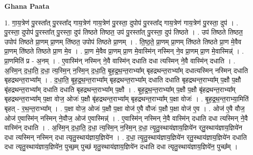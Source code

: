 \documentclass[17pt]{extarticle}
\begin{document}
\textbf{Ghana Paata } \newline

1. गा॒य॒त्रेण॑ पु॒रस्ता᳚त् पु॒रस्ता᳚द् गाय॒त्रेण॑ गाय॒त्रेण॑ पु॒रस्ता॒ दुपोप॑ पु॒रस्ता᳚द् गाय॒त्रेण॑ गाय॒त्रेण॑ पु॒रस्ता॒ दुप॑ । . पु॒रस्ता॒ दुपोप॑ पु॒रस्ता᳚त् पु॒रस्ता॒ दुप॑ तिष्ठते तिष्ठत॒ उप॑ पु॒रस्ता᳚त् पु॒रस्ता॒ दुप॑ तिष्ठते । . उप॑ तिष्ठते तिष्ठत॒ उपोप॑ तिष्ठते प्रा॒णम् प्रा॒णम् ति॑ष्ठत॒ उपोप॑ तिष्ठते प्रा॒णम् । . ति॒ष्ठ॒ते॒ प्रा॒णम् प्रा॒णम् ति॑ष्ठते तिष्ठते प्रा॒ण मे॒वैव प्रा॒णम् ति॑ष्ठते तिष्ठते प्रा॒ण मे॒व । . प्रा॒ण मे॒वैव प्रा॒णम् प्रा॒ण मे॒वास्मि॑न् नस्मिन् ने॒व प्रा॒णम् प्रा॒ण मे॒वास्मिन्न्॑ । . प्रा॒णमिति॑ प्र - अ॒नम् । . ए॒वास्मि॑न् नस्मिन् ने॒वै वास्मि॑न् दधाति दधा त्यस्मिन् ने॒वै वास्मि॑न् दधाति । . अ॒स्मि॒न् द॒धा॒ति॒ द॒धा॒ त्य॒स्मि॒न् न॒स्मि॒न् द॒धा॒ति॒ बृ॒ह॒द्र॒थ॒न्त॒राभ्या᳚म् बृहद्रथन्त॒राभ्या᳚म् दधात्यस्मिन् नस्मिन् दधाति बृहद्रथन्त॒राभ्या᳚म् । . द॒धा॒ति॒ बृ॒ह॒द्र॒थ॒न्त॒राभ्या᳚म् बृहद्रथन्त॒राभ्या᳚म् दधाति दधाति बृहद्रथन्त॒राभ्या᳚म् प॒क्षौ प॒क्षौ बृ॑हद्रथन्त॒राभ्या᳚म् दधाति दधाति बृहद्रथन्त॒राभ्या᳚म् प॒क्षौ । . बृ॒ह॒द्र॒थ॒न्त॒राभ्या᳚म् प॒क्षौ प॒क्षौ बृ॑हद्रथन्त॒राभ्या᳚म् बृहद्रथन्त॒राभ्या᳚म् प॒क्षा वोज॒ ओजः॑ प॒क्षौ बृ॑हद्रथन्त॒राभ्या᳚म् बृहद्रथन्त॒राभ्या᳚म् प॒क्षा वोजः॑ । . बृ॒ह॒द्र॒थ॒न्त॒राभ्या॒मिति॑ बृहत् - र॒थ॒न्त॒राभ्या᳚म् । . प॒क्षा वोज॒ ओजः॑ प॒क्षौ प॒क्षा वोज॑ ए॒वै वौजः॑ प॒क्षौ प॒क्षा वोज॑ ए॒व । . ओज॑ ए॒वै वौज॒ ओज॑ ए॒वास्मि॑न् नस्मिन् ने॒वौज॒ ओज॑ ए॒वास्मिन्न्॑ । . ए॒वास्मि॑न् नस्मिन् ने॒वै वास्मि॑न् दधाति दधा त्यस्मिन् ने॒वै वास्मि॑न् दधाति । . अ॒स्मि॒न् द॒धा॒ति॒ द॒धा॒ त्य॒स्मि॒न् न॒स्मि॒न् द॒धा॒ त्यृ॒तु॒स्थाय॑ज्ञाय॒ज्ञिये॑न र्‌तु॒स्थाय॑ज्ञाय॒ज्ञिये॑न दधा त्यस्मिन् नस्मिन् दधा त्यृतु॒स्थाय॑ज्ञाय॒ज्ञिये॑न । . द॒धा॒ त्यृ॒तु॒स्थाय॑ज्ञाय॒ज्ञिये॑न र्‌तु॒स्थाय॑ज्ञाय॒ज्ञिये॑न दधाति दधा त्यृतु॒स्थाय॑ज्ञाय॒ज्ञिये॑न॒ पुच्छ॒म् पुच्छ॑ मृतु॒स्थाय॑ज्ञाय॒ज्ञिये॑न दधाति दधा त्यृतु॒स्थाय॑ज्ञाय॒ज्ञिये॑न॒ पुच्छ᳚म् । \newline
\end{document}
